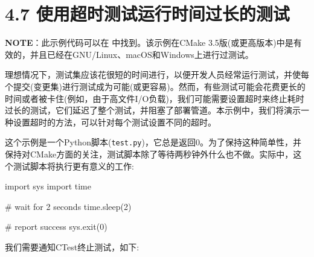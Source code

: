 \section{4.7 使用超时测试运行时间过长的测试}

\begin{myInfoBox}
\textbf{NOTE}：此示例代码可以在  中找到。该示例在CMake 3.5版(或更高版本)中是有效的，并且已经在GNU/Linux、macOS和Windows上进行过测试。
\end{myInfoBox}

理想情况下，测试集应该花很短的时间进行，以便开发人员经常运行测试，并使每个提交(变更集)进行测试成为可能(或更容易)。然而，有些测试可能会花费更长的时间或者被卡住(例如，由于高文件I/O负载)，我们可能需要设置超时来终止耗时过长的测试，它们延迟了整个测试，并阻塞了部署管道。本示例中，我们将演示一种设置超时的方法，可以针对每个测试设置不同的超时。


这个示例是一个Python脚本(\texttt{test.py})，它总是返回0。为了保持这种简单性，并保持对CMake方面的关注，测试脚本除了等待两秒钟外什么也不做。实际中，这个测试脚本将执行更有意义的工作:

\begin{codebox}[python]
import sys
import time

# wait for 2 seconds
time.sleep(2)

# report success
sys.exit(0)
\end{codebox}


我们需要通知CTest终止测试，如下:

